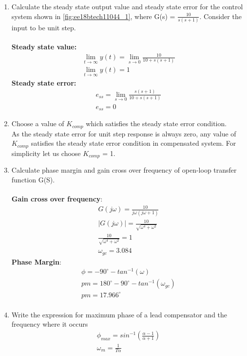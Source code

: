 \begin{enumerate}[label=\thesection.\arabic*.,ref=\thesection.\theenumi]
\item Calculate the steady state output value and steady state error for the control system shown in \ref{fig:ee18btech11044_1}, where G(s) = $\frac{10}{s(s+1)}$. Consider the input to be unit step. \\
\solution \\
\textbf{Steady state value:}
\begin{align}
\lim_{t\to\infty} y(t) = \lim_{s\to0} \frac{10}{10+s(s+1)} \\
\lim_{t\to\infty} y(t) = 1
\end{align}
\textbf{Steady state error:}
\begin{align}
e_{ss} = \lim_{s\to0} \frac{s(s+1)}{10 + s(s+1)} \\
e_{ss} = 0
\end{align}

\item Choose a value of $K_{comp}$ which satisfies the steady state error condition. \\
\solution As the steady state error for unit step response is always zero, any value of $K_{comp}$ satisfies the steady state error condition in compensated system. For simplicity let us choose $K_{comp}$ = 1.

\item Calculate phase margin and gain cross over frequency of open-loop transfer function G(S). \\
\solution \\
\textbf{Gain cross over frequency}:
\begin{align}
    G(j\omega) = \frac{10}{j\omega (j\omega + 1)} \\
    |G(j\omega)| = \frac{10}{\sqrt{\omega^4 +\omega^2}} \\
    \frac{10}{\sqrt{\omega^4 +\omega^2}} = 1 \\
    \omega_{gc} = 3.084
\end{align}
\textbf{Phase Margin}:
\begin{align}
    \phi =  -90^{\circ} - tan^{-1}(\omega) \\ 
    pm = 180^{\circ} -90^{\circ} - tan^{-1}(\omega_{gc}) \\ 
    pm = 17.966^{\circ} \\ 
\end{align}
\item Write the expression for maximum phase of a lead compensator and the frequency where it occurs \\
\solution 
\begin{align}
    \phi_{max} = sin^{-1}(\frac{\alpha - 1}{\alpha + 1}) \label{eq:ee18btech11044_1} \\
    \omega_m = \frac{1}{T \alpha} \label{eq:ee18btech11044_2}
\end{align}


\end{enumerate}
